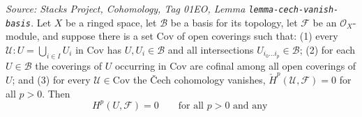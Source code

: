 \begin{lemma}

  \label{lem:cech_to_cohomology_on_basis}
  \textit{Source: Stacks Project, Cohomology, Tag 01EO, Lemma
  \texttt{lemma-cech-vanish-basis}.}
  Let \(X\) be a ringed space, let \(\mathcal{B}\) be a basis for its topology, let
  \(\mathcal{F}\) be an \(\mathcal{O}_X\)-module, and suppose there is a set
  \(\mathrm{Cov}\) of open coverings such that: (1) every \(\mathcal{U} :
  U = \bigcup_{i \in I} U_i\) in \(\mathrm{Cov}\) has \(U, U_i \in \mathcal{B}\) and
  all intersections \(U_{i_0 \ldots i_p} \in \mathcal{B}\); (2) for each
  \(U \in \mathcal{B}\) the coverings of \(U\) occurring in \(\mathrm{Cov}\) are
  cofinal among all open coverings of \(U\); and (3) for every \(\mathcal{U} \in
  \mathrm{Cov}\) the {\v C}ech cohomology vanishes,
  \(\check{H}^p(\mathcal{U}, \mathcal{F}) = 0\) for all \(p > 0\). Then
  \[
    H^p(U, \mathcal{F}) = 0 \qquad \text{for all } p > 0 \text{ and any }
\]
\end{lemma}
